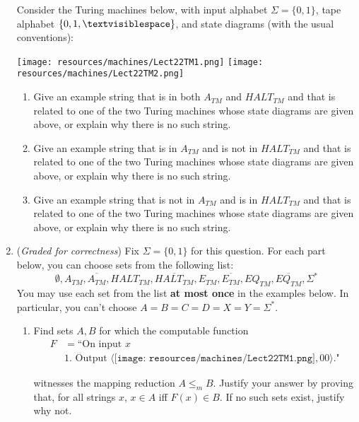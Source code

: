 \documentclass[12pt, oneside]{article}
\begin{document}
\begin{enumerate}
    Consider the Turing machines below, with input alphabet $\Sigma = \{0,1\}$, tape alphabet 
    $\{0, 1, \textvisiblespace\}$, and state diagrams (with the usual conventions):
    \begin{center}
    \texttt{[image: resources/machines/Lect22TM1.png]}\qquad\hfill \qquad
    \texttt{[image: resources/machines/Lect22TM2.png]}
    \end{center}
    \begin{enumerate}
    \item Give an example string that is in both $A_{TM}$ and $HALT_{TM}$ and that is related to one of the 
    two Turing machines whose state diagrams are given above, or explain why there is no such string.
    \item  Give an example string that is in $A_{TM}$ and is not in $HALT_{TM}$ and that is related to one of the 
    two Turing machines whose state diagrams are given above, or explain why there is no such string.
    \item Give an example string that is not in $A_{TM}$ and is in $HALT_{TM}$ and that is related to one of the 
    two Turing machines whose state diagrams are given above, or explain why there is no such string.
    \end{enumerate}
    
    \item ({\it Graded for correctness}) Fix  $\Sigma = \{0,1\}$  for this question. 
    For each part below, you can choose sets from the  following list:  
    \[
    \emptyset, A_{TM}, \overline{A_{TM}}, HALT_{TM}, \overline{HALT_{TM}}, E_{TM}, \overline{E_{TM}}, 
    EQ_{TM}, \overline{EQ_{TM}}, \Sigma^*
    \]
    You may use each set from the list {\bf at most once} in the examples below.  In  particular, you can't choose
    $A =  B = C =  D = X = Y =  \Sigma^*$.

    
    \begin{enumerate}
    \item Find sets $A, B$ for which  the computable function
    \begin{align*}
    F &= \text{``On input $x$} \\
    &\text{1. Output $\langle \texttt{[image: resources/machines/Lect22TM1.png]} , 00\rangle$."}
    \end{align*}
    
    witnesses the mapping reduction $A  \leq_m B$.
    Justify your  answer by  proving that, for all  strings  $x$, $x \in A $ iff  $F(x) \in B$.
    If no such sets exist, justify why not.
    

\end{enumerate}
\end{enumerate}
\end{document}
